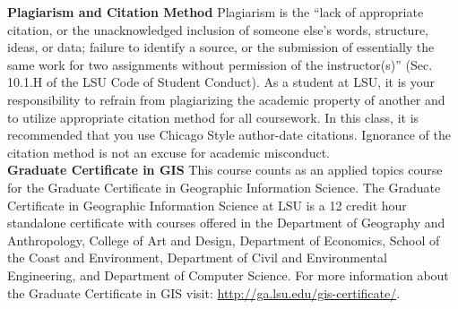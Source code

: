 \documentclass[11pt,article,oneside]{memoir}
\begin{document}
\noindent \textbf{Plagiarism and Citation Method}
Plagiarism is the ``lack of appropriate citation, or the unacknowledged inclusion of someone else's words, structure, ideas, or data; failure to identify a source, or the submission of essentially the same work for two assignments without permission of the instructor(s)'' (Sec. 10.1.H of the LSU Code of Student Conduct). As a student at LSU, it is your responsibility to refrain from plagiarizing the academic property of another and to utilize appropriate citation method for all coursework. In this class, it is recommended that you use Chicago Style author-date citations. Ignorance of the citation method is not an excuse for academic misconduct.\\ 

\noindent \textbf{Graduate Certificate in GIS}
This course counts as an applied topics course for the 
Graduate Certificate in Geographic Information Science.
The Graduate Certificate in Geographic Information Science at LSU 
is a 12 credit hour standalone certificate with courses offered 
in the Department of Geography and Anthropology, College of Art and Design, 
Department of Economics, School of the Coast and Environment, 
Department of Civil and Environmental Engineering, 
and Department of Computer Science. 
For more information about the Graduate Certificate in GIS visit: 
\url{http://ga.lsu.edu/gis-certificate/}. \\
\end{document}
